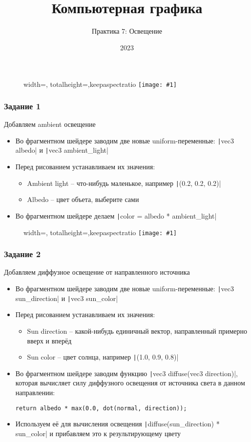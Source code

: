 \documentclass[10pt]{beamer}
\title{Компьютерная графика}
\subtitle{Практика 7: Освещение}
\date{2023}
\newcommand{\slideimage}[1]{
  \begin{figure}
    \begin{adjustbox}{width=\textwidth, totalheight=\textheight-2\baselineskip-2\baselineskip,keepaspectratio}
      \texttt{[image: \#1]}
    \end{adjustbox}
  \end{figure}
}
\begin{document}
\frame{\titlepage}

\begin{frame}[fragile]
\slideimage{0.png}
\end{frame}

\begin{frame}[fragile]
\frametitle{Задание 1}
Добавляем ambient освещение
\begin{itemize}
\item Во фрагментном шейдере заводим две новые uniform-переменные: \texttt|vec3 albedo| и \texttt|vec3 ambient_light|
\item Перед рисованием устанавливаем их значения:
\begin{itemize}
\item Ambient light -- что-нибудь маленькое, например \texttt|(0.2, 0.2, 0.2)|
\item Albedo -- цвет объета, выберите сами
\end{itemize}
\item Во фрагментном шейдере делаем \texttt|color = albedo * ambient_light|
\end{itemize}
\end{frame}

\begin{frame}[fragile]
\slideimage{1.png}
\end{frame}

\begin{frame}[fragile]
\frametitle{Задание 2}
Добавляем диффузное освещение от направленного источника
\begin{itemize}
\item Во фрагментном шейдере заводим две новые uniform-переменные: \texttt|vec3 sun_direction| и \texttt|vec3 sun_color|
\item Перед рисованием устанавливаем их значения:
\begin{itemize}
\item Sun direction -- какой-нибудь единичный вектор, направленный примерно вверх и вперёд
\item Sun color -- цвет солнца, например \texttt|(1.0, 0.9, 0.8)|
\end{itemize}
\item Во фрагментном шейдере заводим функцию \texttt|vec3 diffuse(vec3 direction)|, которая вычисляет силу диффузного освещения от источника света в данном направлении:
\begin{verbatim}
return albedo * max(0.0, dot(normal, direction));
\end{verbatim}
\item Используем её для вычисления освещения \texttt|diffuse(sun_direction) * sun_color| и прибавляем это к результирующему цвету
\end{itemize}
\end{frame}
\end{document}
